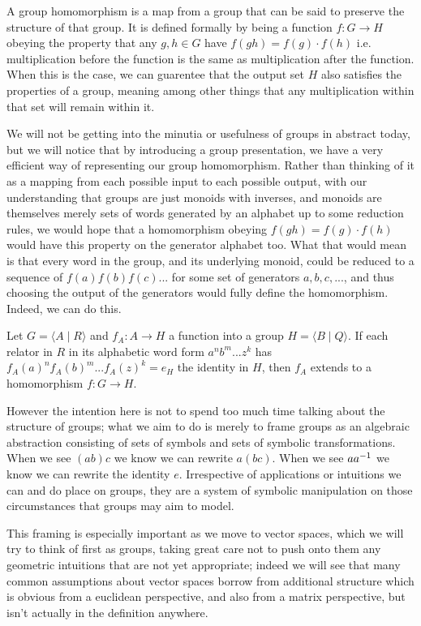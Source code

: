 \documentclass[11pt]{article}
\begin{document}
A group homomorphism is a map from a group that can be said to preserve the structure of that group. It is defined formally by being a function $f \colon G \to H$ obeying the property that any $g,h \in G$ have $f(gh) = f(g) \cdot f(h)$ i.e. multiplication before the function is the same as multiplication after the function. When this is the case, we can guarentee that the output set $H$ also satisfies the properties of a group, meaning among other things that any multiplication within that set will remain within it. 

We will not be getting into the minutia or usefulness of groups in abstract today, but we will notice that by introducing a group presentation, we have a very efficient way of representing our group homomorphism. Rather than thinking of it as a mapping from each possible input to each possible output, with our understanding that groups are just monoids with inverses, and monoids are themselves merely sets of words generated by an alphabet up to some reduction rules, we would hope that a homomorphism obeying $f(gh) = f(g) \cdot f(h)$ would have this property on the generator alphabet too. What that would mean is that every word in the group, and its underlying monoid, could be reduced to a sequence of $f(a) f(b) f(c)... $ for some set of generators $a,b,c,...$, and thus choosing the output of the generators would fully define the homomorphism. Indeed, we can do this.

\begin{theorem}
Let $G = \langle A \mid R \rangle$ and $f_A \colon A \to H$ a function into a group $H = \langle B \mid Q \rangle$. If each relator in $R$ in its alphabetic word form $a^n b^m ... z^k$ has $f_A(a)^n f_A(b)^m ... f_A(z)^k = e_H$ the identity in $H$, then $f_A$ extends to a homomorphism $f\colon G \to H$.
\end{theorem}

However the intention here is not to spend too much time talking about the structure of groups; what we aim to do is merely to frame groups as an algebraic abstraction consisting of sets of symbols and sets of symbolic transformations. When we see $(ab)c$ we know we can rewrite $a(bc)$. When we see $aa^{-1}$ we know we can rewrite the identity $e$. Irrespective of applications or intuitions we can and do place on groups, they are a system of symbolic manipulation on those circumstances that groups may aim to model.

This framing is especially important as we move to vector spaces, which we will try to think of first as groups, taking great care not to push onto them any geometric intuitions that are not yet appropriate; indeed we will see that many common assumptions about vector spaces borrow from additional structure which is obvious from a euclidean perspective, and also from a matrix perspective, but isn't actually in the definition anywhere.
\end{document}
